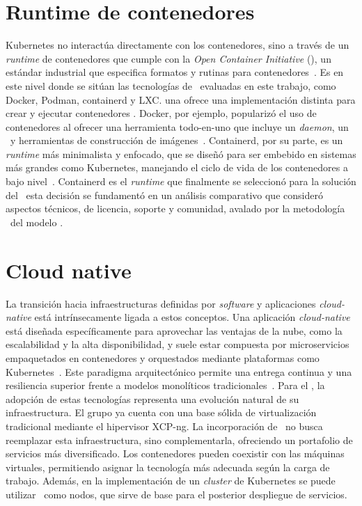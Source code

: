 \section{Runtime de contenedores}
\noindent
Kubernetes no interactúa directamente con los contenedores, sino a través de un \textit{runtime} de contenedores que cumple con la \textit{Open Container Initiative} (\OCI), un estándar industrial que especifica formatos y rutinas para contenedores~\citep{girma2018evaluation}. Es en este nivel donde se sitúan las tecnologías de \VBC\ evaluadas en este trabajo, como Docker, Podman, containerd y LXC. \@Cada una ofrece una implementación distinta para crear y ejecutar contenedores \OCI. Docker, por ejemplo, popularizó el uso de contenedores al ofrecer una herramienta todo-en-uno que incluye un \textit{daemon}, un \CLI\ y herramientas de construcción de imágenes~\citep{Buchanan2020}. Containerd, por su parte, es un \textit{runtime} más minimalista y enfocado, que se diseñó para ser embebido en sistemas más grandes como Kubernetes, manejando el ciclo de vida de los contenedores a bajo nivel~\citep{protogeros2024cargosync}. Containerd es el \textit{runtime} que finalmente se seleccionó para la solución del \GRID\, esta decisión se fundamentó en un análisis comparativo que consideró aspectos técnicos, de licencia, soporte y comunidad, avalado por la metodología \DAR\ del modelo \CMMI\;\@.

\section{Cloud native}
\noindent
La transición hacia infraestructuras definidas por \textit{software} y aplicaciones \textit{cloud-native} está intrínsecamente ligada a estos conceptos. Una aplicación \textit{cloud-native} está diseñada específicamente para aprovechar las ventajas de la nube, como la escalabilidad y la alta disponibilidad, y suele estar compuesta por microservicios empaquetados en contenedores y orquestados mediante plataformas como Kubernetes~\citep{gannon2017cloud}. Este paradigma arquitectónico permite una entrega continua y una resiliencia superior frente a modelos monolíticos tradicionales~\citep{oyeniran2024comprehensive}. Para el \GRID, la adopción de estas tecnologías representa una evolución natural de su infraestructura. El grupo ya cuenta con una base sólida de virtualización tradicional mediante el hipervisor XCP-ng. La incorporación de \VBC\ no busca reemplazar esta infraestructura, sino complementarla, ofreciendo un portafolio de servicios más diversificado. Los contenedores pueden coexistir con las máquinas virtuales, permitiendo asignar la tecnología más adecuada según la carga de trabajo. Además, en la implementación de un \textit{cluster} de Kubernetes se puede utilizar \VM\ como nodos, que sirve de base para el posterior despliegue de servicios.

